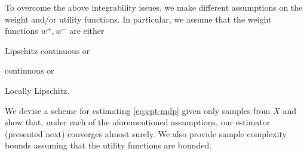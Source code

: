 \documentclass[11pt,letterpaper,english]{article}
\begin{document}
To overcome the above integrability issues, we make different assumptions on the weight and/or utility functions. In particular, we assume that the weight functions $w^+, w^-$ are either 
\begin{inparaenum}[\bfseries (i)]
\item Lipschitz continuous or
\item \holder continuous or
\item Locally Lipschitz.
\end{inparaenum}
We devise a scheme for estimating \eqref{eq:cpt-mdp} given only samples from $X$ and show that, under each of the aforementioned assumptions, our estimator (presented next) converges almost surely. 
We also provide sample complexity bounds assuming that the utility functions are bounded.

% 
\end{document}
